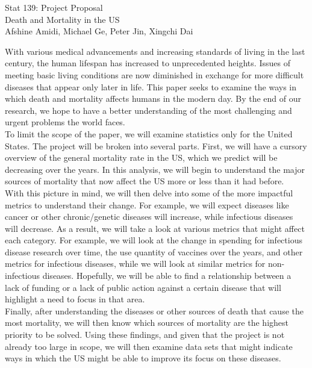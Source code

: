 \documentclass[12pt]{article}
\begin{document}
\begin{mdframed}
  \begin{center}{\huge Stat 139: Project Proposal}\\
    {\large Death and Mortality in the US}\\
Afshine Amidi, Michael Ge, Peter Jin, Xingchi Dai\end{center}
\end{mdframed}

With various medical advancements and increasing standards of living in the last century, the human lifespan has increased to unprecedented heights. Issues of meeting basic living conditions are now diminished in exchange for more difficult diseases that appear only later in life. This paper seeks to examine the ways in which death and mortality affects humans in the modern day. By the end of our research, we hope to have a better understanding of the most challenging and urgent problems the world faces.\\

To limit the scope of the paper, we will examine statistics only for the United States. The project will be broken into several parts. First, we will have a cursory overview of the general mortality rate in the US, which we predict will be decreasing over the years. In this analysis, we will begin to understand the major sources of mortality that now affect the US more or less than it had before.\\

With this picture in mind, we will then delve into some of the more impactful metrics to understand their change. For example, we will expect diseases like cancer or other chronic/genetic diseases will increase, while infectious diseases will decrease. As a result, we will take a look at various metrics that might affect each category. For example, we will look at the change in spending for infectious disease research over time, the use quantity of vaccines over the years, and other metrics for infectious diseases, while we will look at similar metrics for non-infectious diseases. Hopefully, we will be able to find a relationship between a lack of funding or a lack of public action against a certain disease that will highlight a need to focus in that area.\\

Finally, after understanding the diseases or other sources of death that cause the most mortality, we will then know which sources of mortality are the highest priority to be solved. Using these findings, and given that the project is not already too large in scope, we will then examine data sets that might indicate ways in which the US might be able to improve its focus on these diseases.\\
\end{document}
